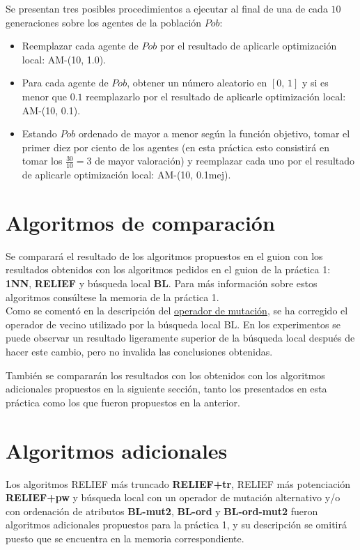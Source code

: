 \documentclass{article}
\begin{document}
\newpage
Se presentan tres posibles procedimientos a ejecutar al final de una de cada $10$ generaciones sobre los agentes de la población $Pob$:

\begin{itemize}
	\item Reemplazar cada agente de $Pob$ por el resultado de aplicarle optimización local: AM-(10, 1.0).
	\item Para cada agente de $Pob$, obtener un número aleatorio en $[0,\,1]$ y si es menor que $0.1$ reemplazarlo por el resultado de aplicarle optimización local: AM-(10, 0.1).
	\item Estando $Pob$ ordenado de mayor a menor según la función objetivo, tomar el primer diez por ciento de los agentes (en esta práctica esto consistirá en tomar los $\frac {30}{10} = 3$ de mayor valoración) y reemplazar cada uno por el resultado de aplicarle optimización local: AM-(10, 0.1mej).
\end{itemize}


\section{Algoritmos de comparación}

Se comparará el resultado de los algoritmos propuestos en el guion con los resultados obtenidos con los algoritmos pedidos en el guion de la práctica 1: \textbf{1NN}, \textbf{RELIEF} y búsqueda local \textbf{BL}. Para más información sobre estos algoritmos consúltese la memoria de la práctica 1. \\

Como se comentó en la descripción del \hyperref[mut]{operador de mutación}, se ha corregido el operador de vecino utilizado por la búsqueda local BL. En los experimentos se puede observar un resultado ligeramente superior de la búsqueda local después de hacer este cambio, pero no invalida las conclusiones obtenidas.

También se compararán los resultados con los obtenidos con los algoritmos adicionales propuestos en la siguiente sección, tanto los presentados en esta práctica como los que fueron propuestos en la anterior.

\section{Algoritmos adicionales}

Los algoritmos RELIEF más truncado \textbf{RELIEF+tr}, RELIEF más potenciación \textbf{RELIEF+pw} y búsqueda local con un operador de mutación alternativo y/o con ordenación de atributos \textbf{BL-mut2}, \textbf{BL-ord} y \textbf{BL-ord-mut2} fueron algoritmos adicionales propuestos para la práctica 1, y su descripción se omitirá puesto que se encuentra en la memoria correspondiente. \\
\end{document}
